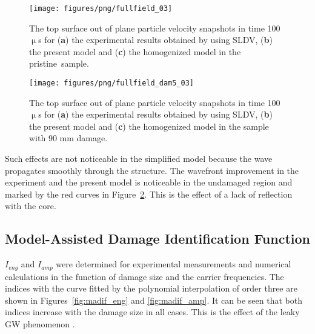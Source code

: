 \documentclass[sensors,article,accept,moreauthors,pdftex]{Definitions/mdpi}
\begin{document}
\begin{paracol}{2}
\vspace{-6pt}
\begin{figure}[H]
		\texttt{[image: figures/png/fullfield\_03]}
	\caption{The %
 top surface out of plane particle velocity snapshots in time 100 \(\upmu\)s for (\textbf{a}) the experimental results obtained by using SLDV, (\textbf{b}) the present model and (\textbf{c}) the homogenized model in the pristine~sample.}
	\label{fig:wavefield}
\end{figure}
\begin{figure}[H]
		\texttt{[image: figures/png/fullfield\_dam5\_03]}
	\caption{The %
 top surface out of plane particle velocity snapshots in time 100~\(\upmu\)s for (\textbf{a}) the experimental results obtained by using SLDV, (\textbf{b}) the present model and (\textbf{c}) the homogenized model in the sample with 90 mm damage.}
	\label{fig:wavefield_dam5}
\end{figure}

Such  effects are not noticeable in the simplified model because the wave propagates smoothly through the structure.
The wavefront improvement in the experiment and the present model is noticeable in the undamaged region and marked by the red curves in Figure~\ref{fig:wavefield_dam5}.
This is the effect of a lack of reflection with the core.
\subsection{Model-Assisted Damage Identification Function}
\label{MADIF}



\(I_{eng}\) and \(I_{amp}\) were determined for experimental measurements and numerical calculations in the function of damage size and the carrier frequencies.
The indices with the curve fitted by the polynomial interpolation of order three are shown in  Figures~\ref{fig:madif_eng} and \ref{fig:madif_amp}.
It can be seen that both indices increase with the damage size in all cases.
This is the effect of the leaky GW phenomenon \cite{song2009guided}.


\end{paracol}
\end{document}
